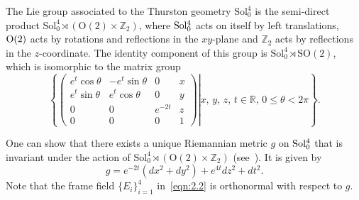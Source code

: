 \documentclass[reqno]{amsart}%
\theoremstyle{definition}
\numberwithin{equation}{section}
\begin{document}
	The Lie group associated to the Thurston geometry $\mathrm{Sol}^4_0$ is the semi-direct product $\mathrm{Sol}^4_0 \rtimes (\mathrm{O}(2) \times \mathbb Z_2)$, where ${\rm Sol_0^4}$ acts on itself by left translations, ${\rm O(2)}$ acts by rotations and reflections in the $xy$-plane and $\mathbb{Z}_2$ acts by reflections in the $z$-coordinate.
	The identity component of this group is $\mathrm{Sol}^4_0 \rtimes \mathrm{SO}(2)$, which is isomorphic to the matrix group
	\begin{equation}\label{eqn:2.100}
		\left\{\left.\left(
		\begin{matrix}
			e^t \cos \theta & -e^t \sin \theta & 0 & x \\
			e^t \sin \theta & e^t \cos \theta & 0 & y \\
			0 & 0 & e^{-2t} & z \\
			0 & 0 & 0 & 1
		\end{matrix}
		\right) \right|x, \, y, \, z, \, t \in \mathbb{R}, \, 0\leq\theta< 2\pi\right\}.
	\end{equation}
	
	One can show that there exists a unique Riemannian metric $g$ on ${\rm Sol_0^4}$ that is invariant under the action of     $\mathrm{Sol}^4_0 \rtimes (\mathrm{O}(2) \times \mathbb Z_2)$ (see~\cite{DIV}).
	It is given by
	\[
	g=e^{-2t}(dx^2+dy^2)+e^{4t}dz^2+dt^2.
	\]
	Note that the frame field $\{E_i\}_{i=1}^4$ in~\eqref{eqn:2.2} is orthonormal with respect to $g$.
	
	
\end{document}
